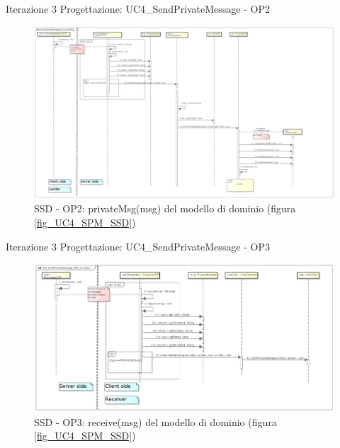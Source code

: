 \documentclass[t]{beamer} %
\begin{document}
\begin{frame} {Iterazione 3 Progettazione: UC4\_SendPrivateMessage - OP2}
   \begin{figure}
     \includegraphics[scale=0.14]{image_astah/Iteration_3_DesignModel/UC4_SendPrivateMessage_SSD_2_privateMsg}{\centering}
     \caption{SSD - OP2: privateMsg(msg) del modello di dominio (figura \ref{fig_UC4_SPM_SSD}) }
     \label{fig_UC4_SSD_SRM_2} 
   \end{figure}
\end{frame}

\begin{frame} {Iterazione 3 Progettazione: UC4\_SendPrivateMessage - OP3}
   \begin{figure}
     \includegraphics[scale=0.22]{image_astah/Iteration_3_DesignModel/UC4_SendPrivateMessage_SSD_3_receive.png}{\centering}
     \caption{SSD - OP3: receive(msg) del modello di dominio (figura \ref{fig_UC4_SPM_SSD})}
     \label{fig_UC4_SSD_SRM_3} 
   \end{figure}
\end{frame}
\end{document}
